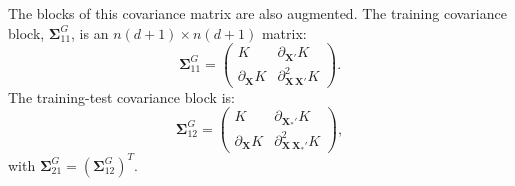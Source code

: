 \documentclass[12pt]{article}
\begin{document}
The blocks of this covariance matrix are also augmented. The training covariance block, $\boldsymbol{\Sigma}^{G}_{11}$, is an $n(d+1) \times n(d+1)$ matrix:
\begin{equation}
	\label{eqn:full_gek_S11}
	\boldsymbol{\Sigma}^{G}_{11} =
	\begin{pmatrix}
		K & \partial_{\mathbf{X}'} K \\
		\partial_{\mathbf{X}} K & \partial^2_{\mathbf{X}\,\mathbf{X}'} K
	\end{pmatrix}.
\end{equation}
The training-test covariance block is:
\begin{equation}
	\label{eqn:full_gek_S12}
	\boldsymbol{\Sigma}^{G}_{12} =
	\begin{pmatrix}
		K & \partial_{\mathbf{X}_*'} K \\
		\partial_{\mathbf{X}} K & \partial^2_{\mathbf{X}\,\mathbf{X}_*'} K
	\end{pmatrix},
\end{equation}
with $\boldsymbol{\Sigma}^{G}_{21} = \left(\boldsymbol{\Sigma}^{G}_{12}\right)^T$.
\end{document}

